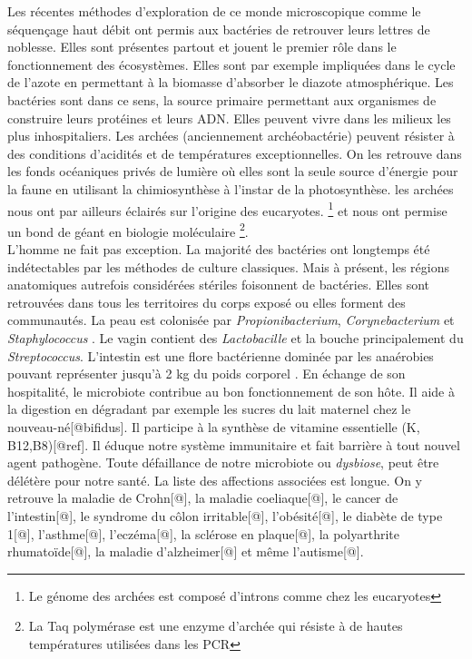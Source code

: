 \documentclass[12pt,a4paper]{article}
\begin{document}
Les récentes méthodes d'exploration de ce monde microscopique comme le séquençage haut débit ont permis aux bactéries de retrouver leurs lettres de noblesse.
Elles sont présentes partout et jouent le premier rôle dans le fonctionnement des écosystèmes. Elles sont par exemple impliquées dans le cycle de l'azote en permettant à la biomasse d'absorber le diazote atmosphérique. Les bactéries sont dans ce sens, la source primaire permettant aux organismes de construire leurs protéines et leurs ADN.
Elles peuvent vivre dans les milieux les plus inhospitaliers. Les archées (anciennement archéobactérie) peuvent résister à des conditions d'acidités et de températures exceptionnelles. On les retrouve dans les fonds océaniques privés de lumière où elles  sont la seule source d'énergie pour la faune en utilisant la chimiosynthèse à l'instar de la photosynthèse. les archées nous ont par ailleurs éclairés sur l’origine des eucaryotes. \footnote{Le génome des archées est composé d'introns comme chez les eucaryotes} et nous ont permise un bond de géant en biologie moléculaire \footnote{La Taq polymérase est une enzyme d'archée qui résiste à de hautes températures utilisées dans les PCR}.\\
L'homme ne fait pas exception. La majorité des bactéries ont longtemps été indétectables par les méthodes de culture classiques. Mais à présent, les régions anatomiques autrefois considérées stériles foisonnent de bactéries. 
Elles sont retrouvées dans tous les territoires du corps exposé ou elles forment des communautés.
La peau est colonisée par \textit{Propionibacterium}, \textit{Corynebacterium} et \textit{Staphylococcus} \citep{Beck}. Le vagin contient des \textit{Lactobacille} et la bouche principalement du \textit{Streptococcus}\cite{Beck}.
L'intestin est une flore bactérienne dominée par les anaérobies pouvant représenter jusqu'à 2 kg du poids corporel \citep{Beck}.
En échange de son hospitalité, le microbiote contribue au bon fonctionnement de son hôte. Il aide à la digestion en dégradant par exemple les sucres du lait maternel chez le nouveau-né[@bifidus]. Il participe à la synthèse de vitamine essentielle (K, B12,B8)[@ref]. Il éduque notre système immunitaire et fait barrière à tout nouvel agent pathogène.
Toute défaillance de notre microbiote ou \textit{dysbiose}, peut être délétère pour notre santé. La liste des affections associées est longue. On y retrouve la maladie de Crohn[@], la maladie coeliaque[@], le cancer de l’intestin[@], le syndrome du côlon irritable[@], l’obésité[@], le diabète de type 1[@], l’asthme[@], l’eczéma[@], la sclérose en plaque[@], la polyarthrite rhumatoïde[@], la maladie d’alzheimer[@] et même l’autisme[@]. \\
\end{document}
